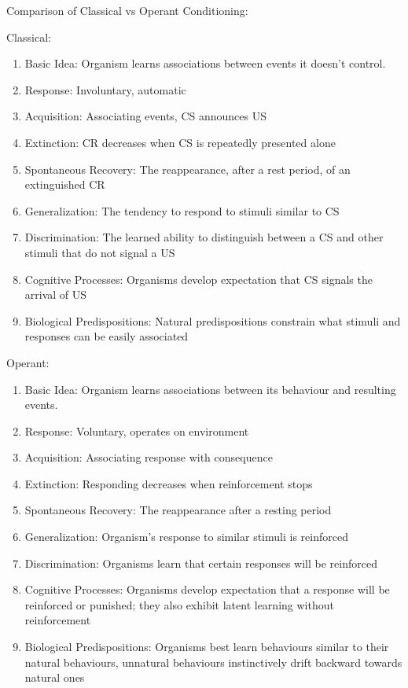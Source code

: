 \documentclass[12pt]{article}
\begin{document}
Comparison of Classical vs Operant Conditioning:

Classical:

\begin{enumerate}
\item Basic Idea: Organism learns associations between events it doesn't control.
\item Response: Involuntary, automatic
\item Acquisition: Associating events, CS announces US
\item Extinction: CR decreases when CS is repeatedly presented alone
\item Spontaneous Recovery: The reappearance, after a rest period, of an extinguished CR
\item Generalization: The tendency to respond to stimuli similar to CS
\item Discrimination: The learned ability to distinguish between a CS and other stimuli that do not signal a US
\item Cognitive Processes: Organisms develop expectation that CS signals the arrival of US
\item Biological Predispositions: Natural predispositions constrain what stimuli and responses can be easily associated

\end{enumerate}

Operant:

\begin{enumerate}
\item Basic Idea: Organism learns associations between its behaviour and resulting events. 
\item Response: Voluntary, operates on environment
\item Acquisition: Associating response with consequence
\item Extinction: Responding decreases when reinforcement stops
\item Spontaneous Recovery: The reappearance after a resting  period
\item Generalization: Organism's response to similar stimuli is reinforced
\item Discrimination: Organisms learn that certain responses will be reinforced
\item Cognitive Processes: Organisms develop expectation that a response will be reinforced or punished; they also exhibit latent learning without reinforcement
\item Biological Predispositions: Organisms best learn behaviours similar to their natural behaviours, unnatural behaviours instinctively drift backward towards natural ones
\end{enumerate}
\end{document}
